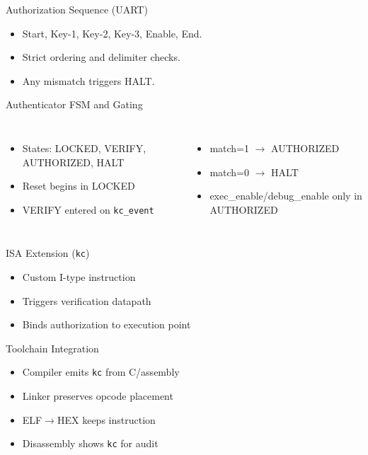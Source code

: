 \documentclass[aspectratio=169]{beamer}
\begin{document}
\begin{frame}{Authorization Sequence (UART)}
  \begin{itemize}
    \item Start, Key-1, Key-2, Key-3, Enable, End.
    \item Strict ordering and delimiter checks.
    \item Any mismatch triggers HALT.
  \end{itemize}
\end{frame}

\begin{frame}{Authenticator FSM and Gating}
  \begin{columns}[T]
    \begin{itemize}
      \item States: LOCKED, VERIFY, AUTHORIZED, HALT
      \item Reset begins in LOCKED
      \item VERIFY entered on \texttt{kc\_event}
    \end{itemize}
    \begin{itemize}
      \item match=1 $\rightarrow$ AUTHORIZED
      \item match=0 $\rightarrow$ HALT
      \item exec\_enable/debug\_enable only in AUTHORIZED
    \end{itemize}
  \end{columns}
\end{frame}

\begin{frame}{ISA Extension (\texttt{kc})}
  \begin{itemize}
    \item Custom I-type instruction
    \item Triggers verification datapath
    \item Binds authorization to execution point
  \end{itemize}
\end{frame}

\begin{frame}{Toolchain Integration}
  \begin{itemize}
    \item Compiler emits \texttt{kc} from C/assembly
    \item Linker preserves opcode placement
    \item ELF$\rightarrow$HEX keeps instruction
    \item Disassembly shows \texttt{kc} for audit
  \end{itemize}
\end{frame}
\end{document}
